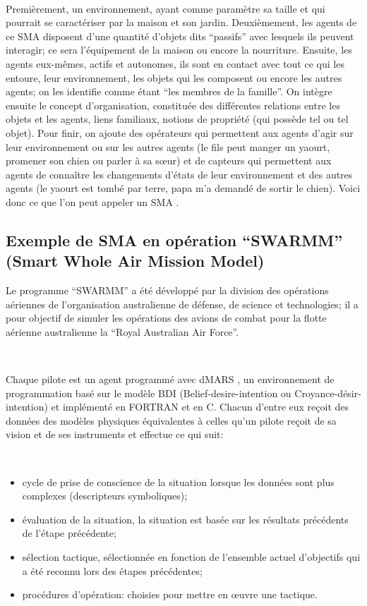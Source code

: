 ~\par
Premièrement, un environnement, ayant comme paramètre sa taille et qui pourrait se caractériser par la maison et son jardin. Deuxièmement, les agents de ce SMA disposent d’une quantité d’objets dits “passifs” avec lesquels ils peuvent interagir; ce sera l’équipement de la maison ou encore la nourriture. Ensuite, les agents eux-mêmes, actifs et autonomes, ils sont en contact avec tout ce qui les entoure, leur environnement, les objets qui les composent ou encore les autres agents; on les identifie comme étant “les membres de la famille”. On intègre ensuite le concept d’organisation, constituée des différentes relations entre les objets et les agents, liens familiaux, notions de propriété (qui possède tel ou tel objet). Pour finir, on ajoute des opérateurs qui permettent aux agents d’agir sur leur environnement ou sur les autres agents (le fils peut manger un yaourt, promener son chien ou parler à sa sœur) et de capteurs qui permettent aux agents de connaître les changements d'états de leur environnement et des autres agents (le yaourt est tombé par terre, papa m'a demandé de sortir le chien). Voici donc ce que l'on peut appeler un SMA \parencite{sma}.


\subsection{Exemple de SMA en opération “SWARMM” (Smart Whole Air Mission Model)} \label{ssec:swarm}

Le  programme “SWARMM” \parencite{jones1999automated} a été développé par la division des opérations aériennes de l’organisation australienne de défense, de science et technologies; il a  pour objectif de simuler les opérations des avions de combat pour la flotte aérienne australienne la “Royal Australian Air Force”.

~\par
Chaque pilote est un agent programmé avec dMARS \parencite{dmars1997formal}, un environnement de programmation basé sur le modèle BDI (Belief-desire-intention ou Croyance-désir-intention) et implémenté en FORTRAN et en C. Chacun d'entre eux reçoit des données des modèles physiques équivalentes à celles qu'un pilote reçoit de sa vision et de ses instruments et effectue ce qui suit:

~\par
\begin{itemize}
\item cycle de prise de conscience de la situation lorsque les données sont plus complexes (descripteurs symboliques);
\item  évaluation de la situation, la situation est basée sur les résultats précédents de l'étape précédente;
\item sélection tactique, sélectionnée en fonction de l'ensemble actuel d'objectifs qui a été reconnu lors des étapes précédentes;
\item procédures d'opération: choisies pour mettre en œuvre une tactique.
\end{itemize}

